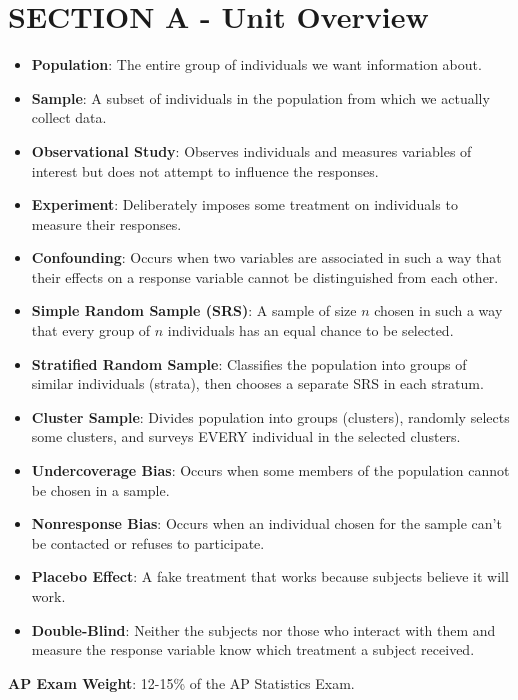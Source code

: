 \section{SECTION A - Unit Overview}
\begin{lessonbox}
\begin{itemize}
    \item \textbf{Population}: The entire group of individuals we want information about.
    \item \textbf{Sample}: A subset of individuals in the population from which we actually collect data.
    \item \textbf{Observational Study}: Observes individuals and measures variables of interest but does not attempt to influence the responses.
    \item \textbf{Experiment}: Deliberately imposes some treatment on individuals to measure their responses.
    \item \textbf{Confounding}: Occurs when two variables are associated in such a way that their effects on a response variable cannot be distinguished from each other.
    \item \textbf{Simple Random Sample (SRS)}: A sample of size $n$ chosen in such a way that every group of $n$ individuals has an equal chance to be selected.
    \item \textbf{Stratified Random Sample}: Classifies the population into groups of similar individuals (strata), then chooses a separate SRS in each stratum.
    \item \textbf{Cluster Sample}: Divides population into groups (clusters), randomly selects some clusters, and surveys EVERY individual in the selected clusters.
    \item \textbf{Undercoverage Bias}: Occurs when some members of the population cannot be chosen in a sample.
    \item \textbf{Nonresponse Bias}: Occurs when an individual chosen for the sample can't be contacted or refuses to participate.
    \item \textbf{Placebo Effect}: A fake treatment that works because subjects believe it will work.
    \item \textbf{Double-Blind}: Neither the subjects nor those who interact with them and measure the response variable know which treatment a subject received.
\end{itemize}
\end{lessonbox}

\textbf{AP Exam Weight}: 12-15\% of the AP Statistics Exam.

